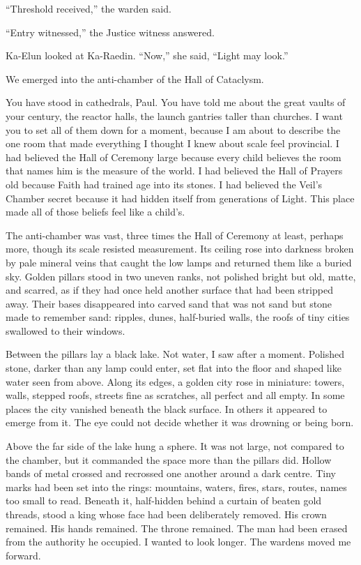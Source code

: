 ``Threshold received,'' the warden said.\par

``Entry witnessed,'' the Justice witness answered.\par

Ka-Elun looked at Ka-Raedin. ``Now,'' she said, ``Light may look.''\par

We emerged into the anti-chamber of the Hall of Cataclysm.\par

You have stood in cathedrals, Paul. You have told me about the great vaults of your century, the reactor halls, the launch gantries taller than churches. I want you to set all of them down for a moment, because I am about to describe the one room that made everything I thought I knew about scale feel provincial. I had believed the Hall of Ceremony large because every child believes the room that names him is the measure of the world. I had believed the Hall of Prayers old because Faith had trained age into its stones. I had believed the Veil's Chamber secret because it had hidden itself from generations of Light. This place made all of those beliefs feel like a child's.\par

The anti-chamber was vast, three times the Hall of Ceremony at least, perhaps more, though its scale resisted measurement. Its ceiling rose into darkness broken by pale mineral veins that caught the low lamps and returned them like a buried sky. Golden pillars stood in two uneven ranks, not polished bright but old, matte, and scarred, as if they had once held another surface that had been stripped away. Their bases disappeared into carved sand that was not sand but stone made to remember sand: ripples, dunes, half-buried walls, the roofs of tiny cities swallowed to their windows.\par

Between the pillars lay a black lake. Not water, I saw after a moment. Polished stone, darker than any lamp could enter, set flat into the floor and shaped like water seen from above. Along its edges, a golden city rose in miniature: towers, walls, stepped roofs, streets fine as scratches, all perfect and all empty. In some places the city vanished beneath the black surface. In others it appeared to emerge from it. The eye could not decide whether it was drowning or being born.\par

Above the far side of the lake hung a sphere. It was not large, not compared to the chamber, but it commanded the space more than the pillars did. Hollow bands of metal crossed and recrossed one another around a dark centre. Tiny marks had been set into the rings: mountains, waters, fires, stars, routes, names too small to read. Beneath it, half-hidden behind a curtain of beaten gold threads, stood a king whose face had been deliberately removed. His crown remained. His hands remained. The throne remained. The man had been erased from the authority he occupied. I wanted to look longer. The wardens moved me forward.\par

